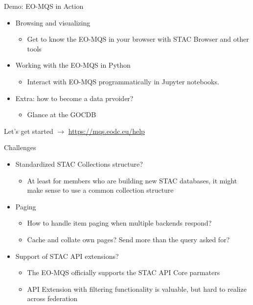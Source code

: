 \documentclass[c,aspectratio=169,14pt]{beamer}
\begin{document}
\begin{frame}{Demo: EO-MQS in Action}
\begin{itemize}
    \item Browsing and visualizing
    \begin{itemize}
    \item Get to know the EO-MQS in your browser with STAC Browser and other tools
    \end{itemize}  
    \item Working with the EO-MQS in Python
    \begin{itemize}
    \item Interact with EO-MQS programmatically in Jupyter notebooks.    
    \end{itemize}      
    \item Extra: how to become a data prvoider?
    \begin{itemize}
    \item Glance at the GOCDB
    \end{itemize}  
\end{itemize}      
Let's get started $\rightarrow$ \url{https://mqs.eodc.eu/help}  
\end{frame}




\begin{frame}{Challenges}
\begin{itemize}
\item Standardized STAC Collections structure?
\begin{itemize}
\item At least for members who are building new STAC databases, it might make sense to use a common collection structure
\end{itemize}
\item Paging
\begin{itemize}
\item How to handle item paging when multiple backends respond?
\item Cache and collate own pages? Send more than the query asked for?
\end{itemize}
\item Support of STAC API extensions?
\begin{itemize}
\item The EO-MQS officially supports the STAC API Core parmaters
\item API Extension with filtering functionality is valuable, but hard to realize across federation
\end{itemize}
\end{itemize}
\end{frame}
\end{document}

